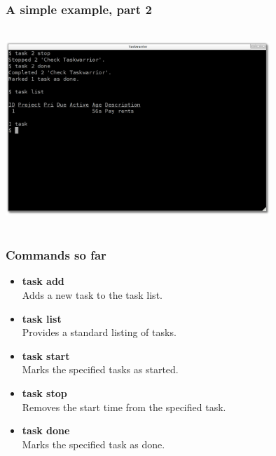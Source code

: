 \documentclass[t,handout]{beamer}
\begin{document}
\begin{frame}
\frametitle{A simple example, part 2}
\begin{center}
\includegraphics[width=10cm,height=7.5cm]{simple_example02.png}
\end{center}
\end{frame}

\begin{frame}
\frametitle{Commands so far}
\begin{itemize}
\item \textbf{task add} \\
Adds a new task to the task list. \pause
\item \textbf{task list} \\
Provides a standard listing of tasks. \pause
\item \textbf{task start} \\
Marks the specified tasks as started. \pause
\item \textbf{task stop} \\
Removes the start time from the specified task. \pause
\item \textbf{task done} \\
Marks the specified task as done.
\end{itemize}
\end{frame}

\end{document}
